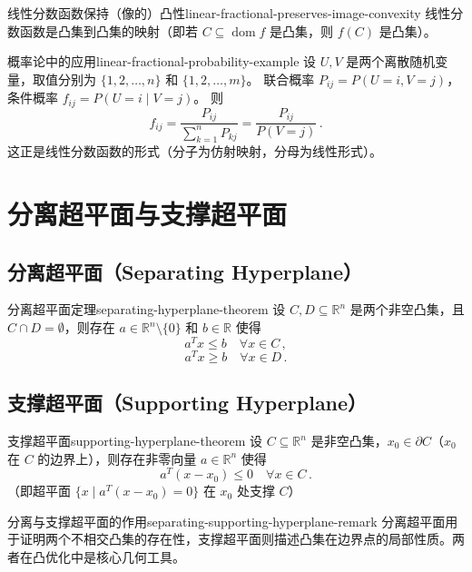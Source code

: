 \documentclass[11pt,a4paper]{article}
\begin{document}
\begin{theorem}{线性分数函数保持（像的）凸性}{linear-fractional-preserves-image-convexity}
线性分数函数是凸集到凸集的映射（即若 $C \subseteq \operatorname{dom} f$ 是凸集，则 $f(C)$ 是凸集）。
\end{theorem}

\begin{example}{概率论中的应用}{linear-fractional-probability-example}
设 $U,V$ 是两个离散随机变量，取值分别为 $\{1,2,\dots,n\}$ 和 $\{1,2,\dots,m\}$。
联合概率 $P_{ij} = P(U=i,V=j)$，条件概率 $f_{ij} = P(U=i \mid V=j)$。
则
\[
f_{ij} = \frac{P_{ij}}{\sum_{k=1}^n P_{kj}} = \frac{P_{ij}}{P(V=j)}\,.
\]
这正是线性分数函数的形式（分子为仿射映射，分母为线性形式）。
\end{example}

\section{分离超平面与支撑超平面}\label{sec:ch2-separation-support}

\subsection{分离超平面（Separating Hyperplane）}
\begin{theorem}{分离超平面定理}{separating-hyperplane-theorem}
设 $C,D \subseteq \mathbb{R}^n$ 是两个非空凸集，且 $C \cap D = \emptyset$，则存在 $a \in \mathbb{R}^n \setminus \{0\}$ 和 $b \in \mathbb{R}$ 使得
\[
a^T x \leq b \quad \forall x \in C\,,
\]
\[
a^T x \geq b \quad \forall x \in D\,.
\]
\end{theorem}

\subsection{支撑超平面（Supporting Hyperplane）}
\begin{theorem}{支撑超平面}{supporting-hyperplane-theorem}
设 $C \subseteq \mathbb{R}^n$ 是非空凸集，$x_0 \in \partial C$（$x_0$ 在 $C$ 的边界上），则存在非零向量 $a \in \mathbb{R}^n$ 使得
\[
a^T (x - x_0) \leq 0 \quad \forall x \in C\,.
\]
（即超平面 $\{ x \mid a^T (x - x_0) = 0 \}$ 在 $x_0$ 处支撑 $C$）
\end{theorem}

\begin{remark}{分离与支撑超平面的作用}{separating-supporting-hyperplane-remark}
分离超平面用于证明两个不相交凸集的存在性，支撑超平面则描述凸集在边界点的局部性质。两者在凸优化中是核心几何工具。
\end{remark}
\end{document}
